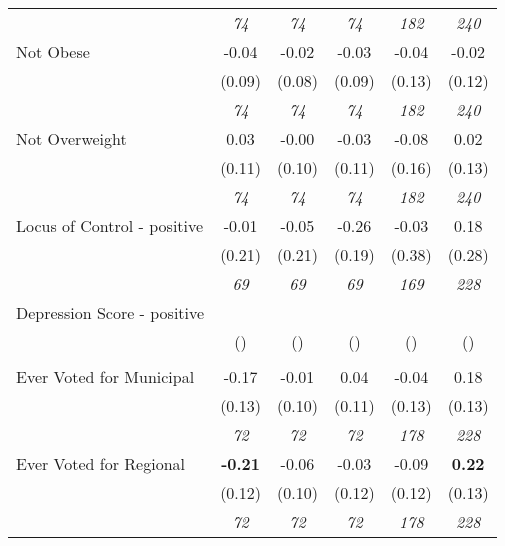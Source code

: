 \begin{tabular}{l c c c c c}
& \textit{ 74 } & \textit{ 74 } & \textit{ 74 } & \textit{ 182 } & \textit{ 240 } \\
Not Obese & -0.04 & -0.02 & -0.03 & -0.04 & -0.02 \\
& (0.09) & (0.08) & (0.09) & (0.13) & (0.12) \\
& \textit{ 74 } & \textit{ 74 } & \textit{ 74 } & \textit{ 182 } & \textit{ 240 } \\
Not Overweight & 0.03 & -0.00 & -0.03 & -0.08 & 0.02 \\
& (0.11) & (0.10) & (0.11) & (0.16) & (0.13) \\
& \textit{ 74 } & \textit{ 74 } & \textit{ 74 } & \textit{ 182 } & \textit{ 240 } \\
Locus of Control - positive & -0.01 & -0.05 & -0.26 & -0.03 & 0.18 \\
& (0.21) & (0.21) & (0.19) & (0.38) & (0.28) \\
& \textit{ 69 } & \textit{ 69 } & \textit{ 69 } & \textit{ 169 } & \textit{ 228 } \\
Depression Score - positive & & & & & \\
& () & () & () & () & () \\
& & & & & \\
Ever Voted for Municipal & -0.17 & -0.01 & 0.04 & -0.04 & 0.18 \\
& (0.13) & (0.10) & (0.11) & (0.13) & (0.13) \\
& \textit{ 72 } & \textit{ 72 } & \textit{ 72 } & \textit{ 178 } & \textit{ 228 } \\
Ever Voted for Regional & \textbf{ -0.21 } & -0.06 & -0.03 & -0.09 & \textbf{ 0.22 } \\
& (0.12) & (0.10) & (0.12) & (0.12) & (0.13) \\
& \textit{ 72 } & \textit{ 72 } & \textit{ 72 } & \textit{ 178 } & \textit{ 228 } \\
\bottomrule
\end{tabular}
